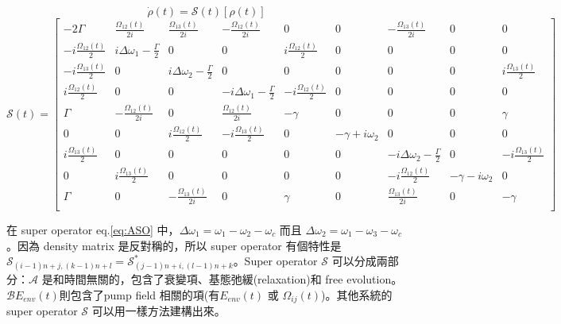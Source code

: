 \documentclass[11pt,a4paper]{article}
\begin{document}
\begin{equation}
\dot{\rho}(t) =  \mathcal{S}(t) \left[ \rho(t) \right]
\end{equation}
\begin{equation}
\label{eq:ASO}
\mathcal{S}(t) =
\begin{bmatrix}
-2\Gamma & \frac{\Omega_{12}(t)}{2i} &\frac{\Omega_{13}(t)}{2i} & -\frac{\Omega_{12}(t)}{2i} & 0&0&-\frac{\Omega_{13}(t)}{2i}&0&0 \\
-i \frac{\Omega_{12}(t)}{2} &i\Delta\omega_1-\frac{\Gamma}{2}&0&0&i \frac{\Omega_{12}(t)}{2}&0&0&0&0\\
-i \frac{\Omega_{13}(t)}{2} &0&i\Delta\omega_2-\frac{\Gamma}{2}&0&0&0&0&0&i \frac{\Omega_{13}(t)}{2}\\
i \frac{\Omega_{12}(t)}{2} &0&0&-i\Delta\omega_1-\frac{\Gamma}{2}&-i \frac{\Omega_{12}(t)}{2}&0&0&0&0\\
\Gamma&- \frac{\Omega_{12}(t)}{2i}&0&\frac{\Omega_{12}(t)}{2i}&-\gamma&0&0&0&\gamma\\
0&0&i \frac{\Omega_{12}(t)}{2}&-i \frac{\Omega_{13}(t)}{2}&0&-\gamma+i\omega_{2}&0&0&0\\
i \frac{\Omega_{13}(t)}{2} &0&0&0&0&0&-i\Delta\omega_2-\frac{\Gamma}{2}&0&-i \frac{\Omega_{13}(t)}{2}\\
0&i \frac{\Omega_{13}(t)}{2}&0&0&0&0&-i \frac{\Omega_{12}(t)}{2}&-\gamma-i\omega_{2}&0\\
\Gamma&0&- \frac{\Omega_{13}(t)}{2i}&0&\gamma&0&\frac{\Omega_{13}(t)}{2i}&0&-\gamma\\
\end{bmatrix}
\end{equation}

在 super operator eq.\ref{eq:ASO} 中，$\Delta\omega_1 = \omega_1-\omega_2-\omega_{c}$ 而且 $\Delta\omega_2 = \omega_1-\omega_3-\omega_{c}$。因為 density matrix 是反對稱的，所以 super operator 有個特性是 $\mathcal{S}_{(i-1)n+j,(k-1)n+l} = \mathcal{S}^{*}_{(j-1)n+i,(l-1)n+k}$。Super operator $\mathcal{S}$ 可以分成兩部分：$\mathcal{A}$ 是和時間無關的，包含了衰變項、基態弛緩(relaxation)和 free evolution。$\mathcal{B}E_{env}(t)$則包含了pump field 相關的項(有$E_{env}(t)$ 或 $\Omega_{ij}(t)$)。其他系統的 super operator $\mathcal{S}$ 可以用一樣方法建構出來。\\
\end{document}

